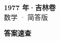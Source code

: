 \documentclass[zihao=-4, a4paper]{ctexart}
\begin{document}
\begin{center}
  {\Large\bfseries 1977 年·吉林卷}\\[4pt]
  {\large 数学 · 简答版}
\end{center}
\medskip
{}

\clearpage
{}
\begin{center}{\Large\bfseries 答案速查}\end{center}
\medskip

\end{document}
